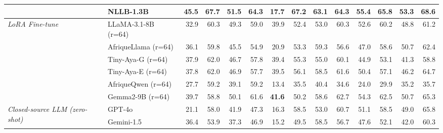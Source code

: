 \begin{table}[t!]
\begin{tabular}{llrrrrrrrrrrrr}
 & NLLB-1.3B & \textbf{45.5} & \textbf{67.7} & \textbf{51.5} & \textbf{64.3} & 17.7 & \textbf{67.2} & \textbf{63.1} & \textbf{64.3} & \textbf{55.4} & \textbf{65.8} & \textbf{53.3} & \textbf{68.6} \\
\midrule
\multirow{6}{*}{\textit{LoRA Fine-tune}} & LLaMA-3.1-8B (r=64) & 32.9 & 60.3 & 49.3 & 59.0 & 39.9 & 52.4 & 53.0 & 60.3 & 52.6 & 60.2 & 48.8 & 61.2 \\
 & AfriqueLlama (r=64) & 36.1 & 59.8 & 45.5 & 54.9 & 20.9 & 53.3 & 59.3 & 56.6 & 47.0 & 58.6 & 50.7 & 62.4 \\
 & Tiny-Aya-G (r=64) & 37.9 & 62.0 & 46.7 & 57.8 & 39.4 & 55.3 & 55.0 & 60.1 & 44.9 & 53.1 & 41.3 & 58.8 \\
 & Tiny-Aya-E (r=64) & 37.8 & 62.0 & 46.9 & 57.7 & 39.5 & 56.1 & 58.5 & 61.6 & 50.4 & 57.1 & 46.2 & 64.7 \\
 & AfriqueQwen (r=64) & 27.7 & 59.2 & 39.1 & 59.2 & 13.4 & 35.5 & 40.4 & 34.6 & 24.0 & 29.9 & 35.2 & 35.7 \\
 & Gemma2-9B (r=64) & 39.7 & 58.8 & 50.1 & 61.6 & \textbf{41.6} & 50.2 & 58.6 & 62.7 & 54.3 & 62.5 & 50.7 & 65.3 \\
\midrule
\multirow{2}{*}{\textit{Closed-source LLM (zero-shot)}} & GPT-4o & 21.1 & 58.0 & 41.9 & 47.3 & 16.3 & 58.5 & 53.0 & 60.7 & 51.1 & 58.5 & 49.0 & 65.8 \\
 & Gemini-1.5 & 36.4 & 53.9 & 37.3 & 46.9 & 15.2 & 49.5 & 58.5 & 56.7 & 47.6 & 52.1 & 42.0 & 60.3 \\
\bottomrule
\end{tabular}
\end{table}